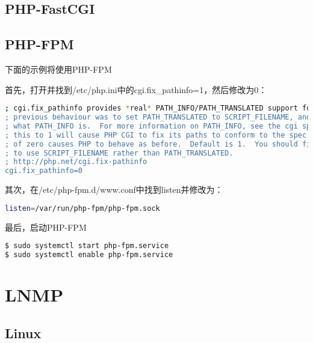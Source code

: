 \section{PHP-FastCGI}


\section{PHP-FPM}



下面的示例将使用PHP-FPM

首先，打开并找到/etc/php.ini中的cgi.fix\_pathinfo=1，然后修改为0：


\begin{lstlisting}[language=bash]
; cgi.fix_pathinfo provides *real* PATH_INFO/PATH_TRANSLATED support for CGI.  PHP's
; previous behaviour was to set PATH_TRANSLATED to SCRIPT_FILENAME, and to not grok
; what PATH_INFO is.  For more information on PATH_INFO, see the cgi specs.  Setting
; this to 1 will cause PHP CGI to fix its paths to conform to the spec.  A setting
; of zero causes PHP to behave as before.  Default is 1.  You should fix your scripts
; to use SCRIPT_FILENAME rather than PATH_TRANSLATED.
; http://php.net/cgi.fix-pathinfo
cgi.fix_pathinfo=0
\end{lstlisting}


其次，在/etc/php-fpm.d/www.conf中找到listen并修改为：



\begin{lstlisting}[language=bash]
listen=/var/run/php-fpm/php-fpm.sock
\end{lstlisting}


最后，启动PHP-FPM



\begin{lstlisting}[language=bash]
$ sudo systemctl start php-fpm.service
$ sudo systemctl enable php-fpm.service
\end{lstlisting}






\chapter{LNMP}



\section{Linux}


